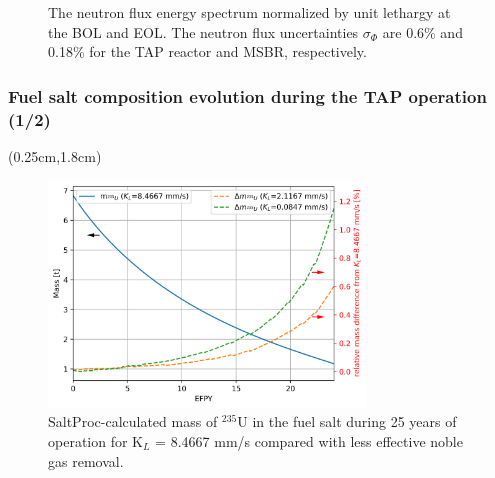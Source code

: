\begin{frame}
\begin{textblock*}{12.6cm}
\begin{figure}[htp!]
\begin{overprint}
		\end{overprint}
			\vspace{-3mm}
		\caption{The neutron flux energy spectrum normalized by unit lethargy 
		at the BOL and EOL. The neutron flux uncertainties $\sigma_{\Phi}$ are 
		0.6\% and 0.18\% for the \gls{TAP} reactor and \gls{MSBR}, 
		respectively.}
	\end{figure}
\end{textblock*}
\end{frame}


\begin{frame}
\frametitle{Fuel salt composition evolution during the TAP operation (1/2)}
\begin{textblock*}{12.25cm}(0.25cm,1.8cm) %
	\begin{figure}[htp!] %
		\centering
		\includegraphics[width=0.75\textwidth]{../dissertation/figures/ch4/eps/u235.png}
			\vspace{-2mm}
		\caption{SaltProc-calculated mass of $^{235}$U in the fuel salt during 
		25 years of operation
for K$_L$ = 8.4667 mm/s compared with less 
		effective noble gas removal.}
	\end{figure}
\end{textblock*}
\end{frame}

